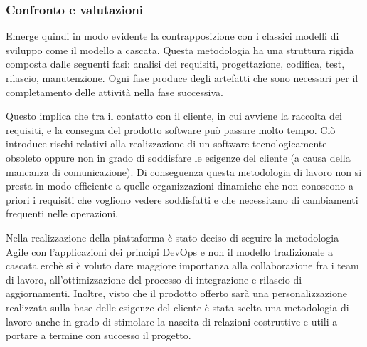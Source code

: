 \subsubsection{Confronto e valutazioni}
Emerge quindi in modo evidente la contrapposizione con i classici modelli di sviluppo come il modello a cascata.
Questa metodologia ha una struttura rigida composta dalle seguenti fasi: analisi dei requisiti, progettazione, codifica, test, rilascio, manutenzione.
Ogni fase produce degli artefatti che sono necessari per il completamento delle attività nella fase successiva.

Questo implica che tra il contatto con il cliente, in cui avviene la raccolta dei requisiti, e la consegna del prodotto software può passare molto tempo.
Ciò introduce rischi relativi alla realizzazione di un software tecnologicamente obsoleto oppure non in grado di soddisfare le
esigenze del cliente (a causa della mancanza di comunicazione).
Di conseguenza questa metodologia di lavoro non si presta in modo efficiente a quelle organizzazioni dinamiche che non conoscono
a priori i requisiti che vogliono vedere soddisfatti e che necessitano di cambiamenti frequenti nelle operazioni.

Nella realizzazione della piattaforma è stato deciso di seguire la metodologia Agile con l'applicazioni dei principi DevOps e non il modello tradizionale a cascata
erchè si è voluto dare maggiore importanza alla collaborazione fra i team di lavoro, all'ottimizzazione del processo di integrazione e rilascio di aggiornamenti.
Inoltre, visto che il prodotto offerto sarà una personalizzazione realizzata sulla base delle esigenze del cliente
è stata scelta una metodologia di lavoro anche in grado di stimolare la nascita di relazioni costruttive e utili a portare a termine con successo il progetto.


